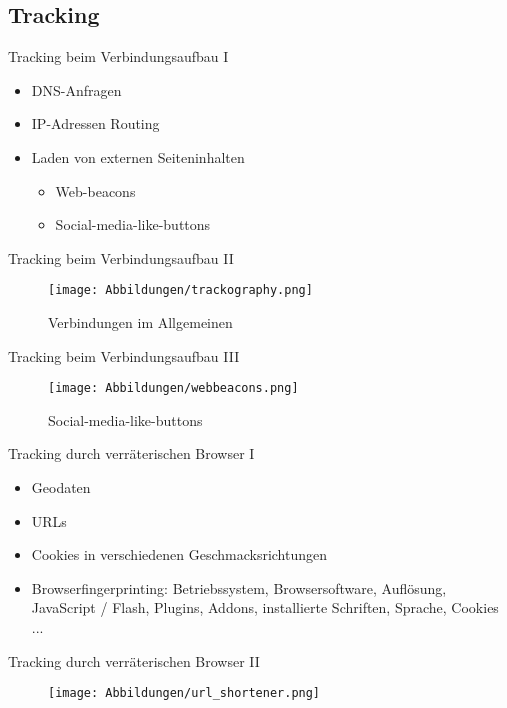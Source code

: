 \documentclass[hyperref={colorlinks,linkcolor=white}, utf8]{beamer}
\begin{document}
	\subsection{Tracking}
	\begin{frame}{Tracking beim Verbindungsaufbau I}
		\begin{itemize}
			\item DNS-Anfragen
			\item IP-Adressen Routing
			\item Laden von externen Seiteninhalten
			\begin{itemize}
				\item Web-beacons
				\item Social-media-like-buttons
			\end{itemize}
		\end{itemize}
	\end{frame}
	
	\begin{frame}{Tracking beim Verbindungsaufbau II}
		\begin{figure}[H]
			\texttt{[image: Abbildungen/trackography.png]}
			\label{fig:trackography}
			\caption{Verbindungen im Allgemeinen}
		\end{figure}
	\end{frame}
	
	\begin{frame}{Tracking beim Verbindungsaufbau III}
		\begin{figure}[H]
			\texttt{[image: Abbildungen/webbeacons.png]}
			\label{fig:webbeacons}
			\caption{Social-media-like-buttons}
		\end{figure}
	\end{frame}
	
	
	\begin{frame}{Tracking durch verräterischen Browser I}
		\begin{itemize}
			\item Geodaten
			\item URLs 
			\item Cookies in verschiedenen Geschmacksrichtungen
			\item Browserfingerprinting: Betriebssystem, Browsersoftware, Auflösung, JavaScript / Flash, Plugins, Addons, installierte Schriften, Sprache, Cookies ...
		\end{itemize}
	\end{frame}
	
	\begin{frame}{Tracking durch verräterischen Browser II}
		\begin{figure}[V]
			\texttt{[image: Abbildungen/url\_shortener.png]}
			\label{fig:url shortener}
		\end{figure}
	\end{frame}
	
\end{document}
